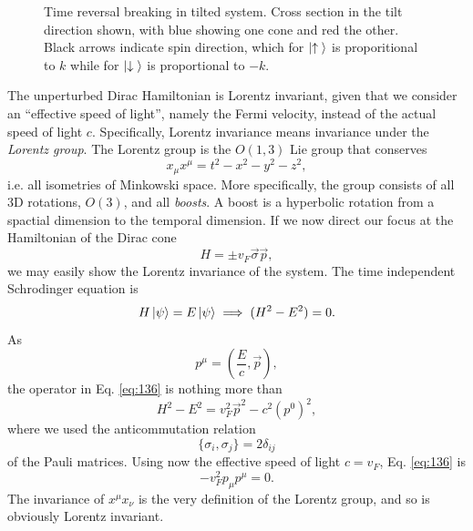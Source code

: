 \begin{figure}[h]
  \centering
  \caption{Time reversal breaking in tilted system.
    Cross section in the tilt direction shown, with blue showing one cone and red the other.
    Black arrows indicate spin direction, which for \(\ket{\uparrow {}}\) is proporitional to  \(k\) while for \(\ket{\downarrow {}}\) is proportional to \( -k \).
  }
\end{figure}

The unperturbed Dirac Hamiltonian is Lorentz invariant, given that we consider an ``effective speed of light'', namely the Fermi velocity, instead of the actual speed of light \( c \).
Specifically, Lorentz invariance means invariance under the \emph{Lorentz group}.
The Lorentz group is the \( O(1,3) \) Lie group that conserves
\[
x_{\mu } x^{\mu } = t^2 - x^2 - y^2 - z^2,
\]
i.e. all isometries of Minkowski space.
More specifically, the group consists of all 3D rotations, \( O(3) \), and all \emph{boosts}.
A boost is a hyperbolic rotation from a spactial dimension to the temporal dimension.
If we now direct our focus at the Hamiltonian of the Dirac cone
\[
H = \pm v_{F} \vec{\sigma} \vec{p},
\]
we may easily show the Lorentz invariance of the system.
The time independent Schrodinger equation is
\begin{equation}
  \label{eq:136}
  H \ket{\psi } = E \ket{\psi } \implies (H^2 - E^2) = 0.
\end{equation}
As
\[
p^{\mu } = \left(\frac{E}{c}, \vec{p}\right),
\]
the operator in Eq. \eqref{eq:136} is nothing more than
\begin{equation}
  \label{eq:137}
  H^2-E^2 = v_{F}^2 \vec{p}^2 - c^2 \left(p^0\right)^2 ,
\end{equation}
where we used the anticommutation relation
\[
\{\sigma_{i}, \sigma_{j}\} =  2 \delta _{ij}
\]
of the Pauli matrices.
Using now the effective speed of light \( c=v_F \), Eq. \eqref{eq:136} is
\begin{equation}
  \label{eq:138}
  - v_F^2 p_{\mu } p^{\mu } = 0.
\end{equation}
The invariance of \( x^{\mu} x_{\nu} \) is the very definition of the Lorentz group, and so is obviously Lorentz invariant.


